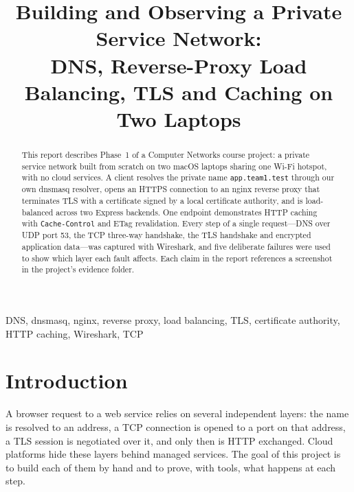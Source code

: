\documentclass[conference]{IEEEtran}
\newcommand{\cmd}[1]{\texttt{#1}}
\begin{document}
\title{Building and Observing a Private Service Network:\\ DNS, Reverse-Proxy Load Balancing, TLS and Caching on Two Laptops}

\author{
\and
{}
}

\maketitle

\begin{abstract}
This report describes Phase~1 of a Computer Networks course project: a private service network built from scratch on two macOS laptops sharing one Wi-Fi hotspot, with no cloud services. A client resolves the private name \cmd{app.team1.test} through our own dnsmasq resolver, opens an HTTPS connection to an nginx reverse proxy that terminates TLS with a certificate signed by a local certificate authority, and is load-balanced across two Express backends. One endpoint demonstrates HTTP caching with \cmd{Cache-Control} and ETag revalidation. Every step of a single request---DNS over UDP port 53, the TCP three-way handshake, the TLS handshake and encrypted application data---was captured with Wireshark, and five deliberate failures were used to show which layer each fault affects. Each claim in the report references a screenshot in the project's evidence folder.
\end{abstract}

\begin{IEEEkeywords}
DNS, dnsmasq, nginx, reverse proxy, load balancing, TLS, certificate authority, HTTP caching, Wireshark, TCP
\end{IEEEkeywords}

\section{Introduction}
A browser request to a web service relies on several independent layers: the name is resolved to an address, a TCP connection is opened to a port on that address, a TLS session is negotiated over it, and only then is HTTP exchanged. Cloud platforms hide these layers behind managed services. The goal of this project is to build each of them by hand and to prove, with tools, what happens at each step.
\end{document}
